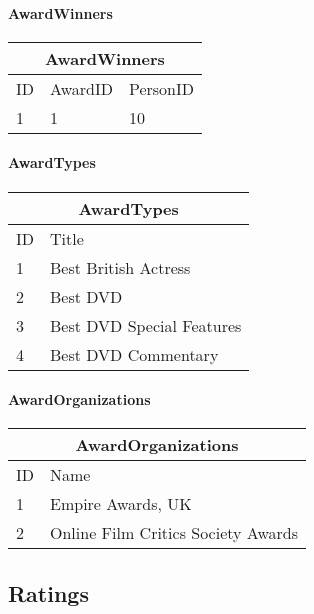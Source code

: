 \paragraph{AwardWinners}

\begin{center}
\begin{tabular}{|l|l|l|}
\hline
\multicolumn{3}{|c|}{AwardWinners} \\ \hline
ID & AwardID & PersonID \\ \hline \hline
1 & 1 & 10 \\ \hline
\end{tabular}
\end{center}

\paragraph{AwardTypes}

\begin{center}
\begin{tabular}{|l|l|}
\hline
\multicolumn{2}{|c|}{AwardTypes} \\ \hline
ID & Title \\ \hline \hline
1 & Best British Actress \\ \hline
2 & Best DVD \\ \hline
3 & Best DVD Special Features \\ \hline
4 & Best DVD Commentary \\ \hline
\end{tabular}
\end{center}

\paragraph{AwardOrganizations}

\begin{center}
\begin{tabular}{|l|l|}
\hline
\multicolumn{2}{|c|}{AwardOrganizations} \\ \hline
ID & Name \\ \hline \hline
1 & Empire Awards, UK \\ \hline
2 & Online Film Critics Society Awards \\ \hline
\end{tabular}
\end{center}

\subsection{Ratings}

